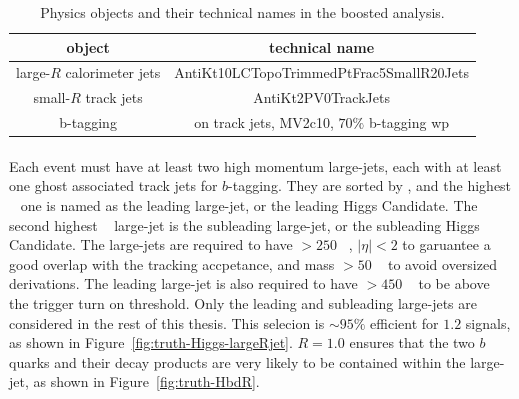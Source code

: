 \begin{table}[bhp]
\begin{center}
\begin{tabular}{c|c}
  object & technical name \\
  \hline
  large-$R$ calorimeter jets & AntiKt10LCTopoTrimmedPtFrac5SmallR20Jets \\
  small-$R$ track jets       & AntiKt2PV0TrackJets \\
  b-tagging                  & on track jets, MV2c10, $70\%$ b-tagging wp \\
\end{tabular}
\caption{Physics objects and their technical names in the boosted analysis.} %
\label{tab:boosted-objects}
\end{center}
\end{table}

\paragraph{}
Each event must have at least two high momentum large-\R jets, each with at least one ghost associated track jets for $b$-tagging.
They are sorted by \pt, and the highest \pt~ one is named as the leading large-\R jet, or the leading Higgs Candidate.
The second highest \pt~ large-\R jet is the subleading large-\R jet, or the subleading Higgs Candidate.
The large-\R jets are required to have \pt $> 250$ \GeV~, $|\eta| < 2$ to garuantee a good overlap with the tracking accpetance, and mass $> 50$ \GeV~ to avoid oversized derivations.
The leading large-\R jet is also required to have \pt $> 450$ \GeV~ to be above the trigger turn on threshold.
Only the leading and subleading large-\R jets are considered in the rest of this thesis.
This selecion is $\sim 95\%$ efficient for $1.2$ \TeV signals, as shown in Figure~\ref{fig:truth-Higgs-largeRjet}. 
$R = 1.0$ ensures that the two $b$ quarks and their decay products are very likely to be contained within the large-\R jet, as shown in Figure~\ref{fig:truth-HbdR}. 

